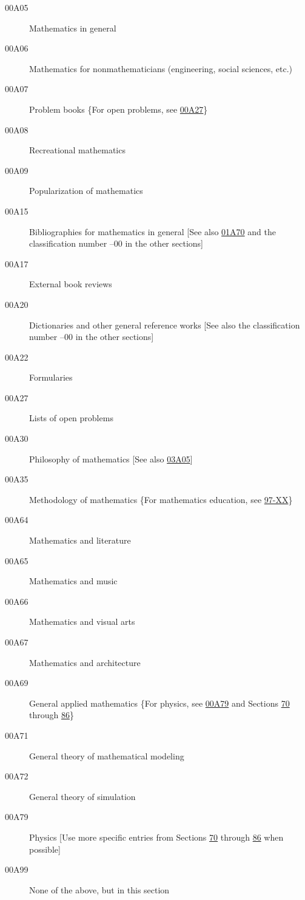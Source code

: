 \begin{description}
\item [00A05]\label{00A05} Mathematics in general
\item [00A06]\label{00A06} Mathematics for nonmathematicians (engineering, social sciences, etc.)
\item [00A07]\label{00A07} Problem books \{For open problems, see \hyperref[00A27]{00A27}\}
\item [00A08]\label{00A08} Recreational mathematics
\item [00A09]\label{00A09} Popularization of mathematics
\item [00A15]\label{00A15} Bibliographies for mathematics in general [See also \hyperref[01A70]{01A70} and the classification number --00 in the other sections]
\item [00A17]\label{00A17} External book reviews
\item [00A20]\label{00A20} Dictionaries and other general reference works [See also the classification number --00 in the other sections]
\item [00A22]\label{00A22} Formularies
\item [00A27]\label{00A27} Lists of open problems
\item [00A30]\label{00A30} Philosophy of mathematics [See also \hyperref[03A05]{03A05}]
\item [00A35]\label{00A35} Methodology of mathematics \{For mathematics education, see \hyperref[97-XX]{97-XX}\}
\item [00A64]\label{00A64} Mathematics and literature
\item [00A65]\label{00A65} Mathematics and music
\item [00A66]\label{00A66} Mathematics and visual arts
\item [00A67]\label{00A67} Mathematics and architecture
\item [00A69]\label{00A69} General applied mathematics \{For physics, see \hyperref[00A79]{00A79} and Sections \hyperref[70-XX]{70} through \hyperref[86-XX]{86}\}
\item [00A71]\label{00A71} General theory of mathematical modeling
\item [00A72]\label{00A72} General theory of simulation
\item [00A79]\label{00A79} Physics [Use more specific entries from Sections \hyperref[70-XX]{70} through \hyperref[86-XX]{86} when possible]
\item [00A99]\label{00A99} None of the above, but in this section
\end{description}
